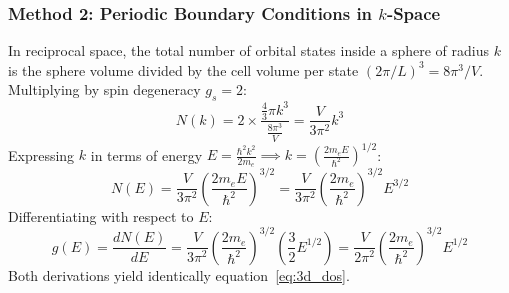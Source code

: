 \documentclass[11pt,a4paper]{article}
\begin{document}
\subsubsection{Method 2: Periodic Boundary Conditions in $k$-Space}
In reciprocal space, the total number of orbital states inside a sphere of radius $k$ is the sphere volume divided by the cell volume per state $(2\pi/L)^3 = 8\pi^3/V$. Multiplying by spin degeneracy $g_s = 2$:
\begin{equation}
N(k) = 2 \times \frac{\frac{4}{3}\pi k^3}{\frac{8\pi^3}{V}} = \frac{V}{3\pi^2}k^3
\label{eq:N_k_sphere}
\end{equation}
Expressing $k$ in terms of energy $E = \frac{\hbar^2 k^2}{2m_e} \implies k = \left(\frac{2m_e E}{\hbar^2}\right)^{1/2}$:
\begin{equation}
N(E) = \frac{V}{3\pi^2}\left(\frac{2m_e E}{\hbar^2}\right)^{3/2} = \frac{V}{3\pi^2}\left(\frac{2m_e}{\hbar^2}\right)^{3/2} E^{3/2}
\label{eq:cumulative_N_E}
\end{equation}
Differentiating with respect to $E$:
\begin{equation}
g(E) = \frac{dN(E)}{dE} = \frac{V}{3\pi^2}\left(\frac{2m_e}{\hbar^2}\right)^{3/2} \left(\frac{3}{2}E^{1/2}\right) = \frac{V}{2\pi^2}\left(\frac{2m_e}{\hbar^2}\right)^{3/2} E^{1/2}
\end{equation}
Both derivations yield identically equation~\eqref{eq:3d_dos}.
\end{document}
